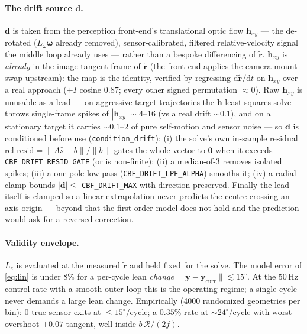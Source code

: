 \documentclass[11pt]{article}
\begin{document}
\paragraph{The drift source $\boldsymbol{d}$.} $\boldsymbol{d}$ is taken from the perception front-end's
translational optic flow $\boldsymbol{h}_{xy}$ --- the de-rotated ($L_\omega\boldsymbol\omega$ already
removed), sensor-calibrated, filtered relative-velocity signal the middle loop already uses --- rather
than a bespoke differencing of $\tilde{\boldsymbol{r}}$. $\boldsymbol{h}_{xy}$ is \emph{already} in the
image-tangent frame of $\tilde{\boldsymbol{r}}$ (the front-end applies the camera-mount swap upstream):
the map is the identity, verified by regressing $\mathrm{d}\tilde{\boldsymbol{r}}/\mathrm{d}t$ on
$\boldsymbol{h}_{xy}$ over a real approach ($+I$ cosine $0.87$; every other signed permutation
$\approx 0$). Raw $\boldsymbol{h}_{xy}$ is unusable as a lead --- on aggressive target trajectories the
$\boldsymbol{h}$ least-squares solve throws single-frame spikes of $|\boldsymbol{h}_{xy}|\sim 4$--$16$
(vs a real drift $\sim 0.1$), and on a stationary target it carries $\sim 0.1$--$2$ of pure self-motion
and sensor noise --- so $\boldsymbol{d}$ is conditioned before use (\texttt{condition\_drift}):
(i) the solve's own in-sample residual $\mathrm{rel\_resid}=\lVert A\hat s-b\rVert/\lVert b\rVert$ gates
the whole vector to $\boldsymbol{0}$ when it exceeds \texttt{CBF\_DRIFT\_RESID\_GATE} (or is non-finite);
(ii) a median-of-3 removes isolated spikes; (iii) a one-pole low-pass (\texttt{CBF\_DRIFT\_LPF\_ALPHA})
smooths it; (iv) a radial clamp bounds $|\boldsymbol{d}|\le$ \texttt{CBF\_DRIFT\_MAX} with direction
preserved. Finally the lead itself is clamped so a linear extrapolation never predicts the centre
crossing an axis origin --- beyond that the first-order model does not hold and the prediction would ask
for a reversed correction.

\paragraph{Validity envelope.} $L_e$ is evaluated at the measured $\tilde{\boldsymbol{r}}$ and held fixed
for the solve. The model error of \eqref{eq:lin} is under $8\%$ for a per-cycle lean \emph{change}
$\|\boldsymbol{y}-\boldsymbol{y}_\text{curr}\|\lesssim 15^\circ$. At the $50$\,Hz control rate with a
smooth outer loop this is the operating regime; a single cycle never demands a large lean change. Empirically
(4000 randomized geometries per bin): $0$ true-sensor exits at $\le15^\circ$/cycle; a $0.35\%$ rate at
$\sim24^\circ$/cycle with worst overshoot $+0.07$ tangent, well inside $b\,\mathcal{R}/(2f)$.
\end{document}
